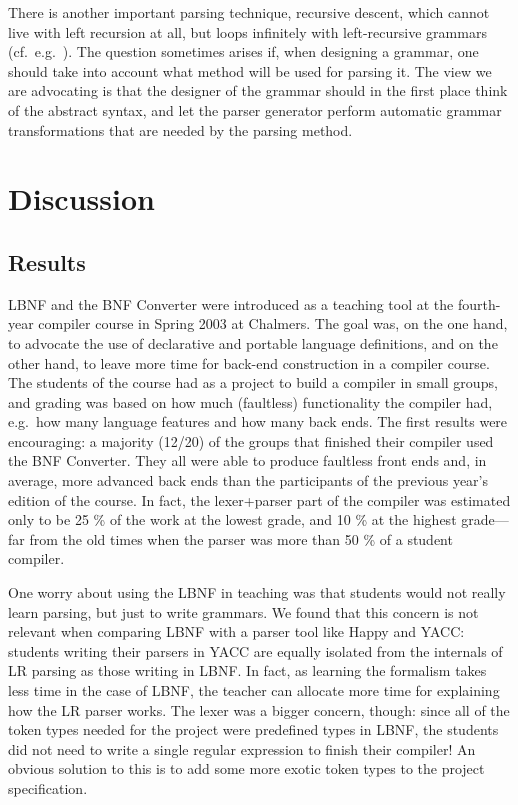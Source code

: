 \documentclass[10pt]{article}
\begin{document}
There is another important parsing technique, recursive descent, 
which cannot live with left recursion at all, but loops infinitely
with left-recursive grammars (cf.\ e.g.\ \cite{appel}).
The question sometimes arises if, when designing a grammar, 
one should take into account what method will be used for parsing it. 
The view we are advocating is that the designer of the grammar
should in the first place think of the abstract syntax, and let
the parser generator perform automatic
grammar transformations that are needed by the parsing method.




\section{Discussion}

\subsection{Results}

\label{results}

LBNF and the BNF Converter\cite{bnfc} were introduced as a teaching tool at the 
fourth-year compiler course in Spring 2003 at Chalmers.
The goal was, on the one hand, to advocate the use of declarative
and portable language definitions, and on the other hand, to
leave more time for back-end construction in a compiler course.
The students of the course had as a project to build a compiler in small
groups, and grading was based on how much (faultless) functionality 
the compiler had, e.g.\ how many language features and how many back ends.
The first results were
encouraging: a majority (12/20) of the
groups that finished their compiler used the BNF Converter. They all were
able to produce faultless front ends and, in average, more advanced 
back ends than the participants of the previous year's edition of the
course. In fact, the lexer+parser part of the compiler was estimated
only to be 25 \% of the work at the lowest grade, and 10 \% at the
highest grade---far from the old times when the parser was more than 50 \% of
a student compiler.

One worry about using the LBNF in teaching was that students would
not really learn parsing, but just to write grammars. We found that this
concern is not relevant when comparing LBNF with a parser tool like Happy and 
YACC: students writing their parsers in YACC are equally isolated 
from the internals of LR parsing as those writing in LBNF. In fact, as learning
the formalism takes less time in the case of LBNF, the teacher can allocate more
time for explaining how the LR parser works. The lexer was a bigger concern, though:
since all of the token types needed for the project were predefined types in LBNF,
the students did not need to write a single regular expression to finish their 
compiler! An obvious solution to this is to add some more exotic token types to the
project specification.
\end{document}
